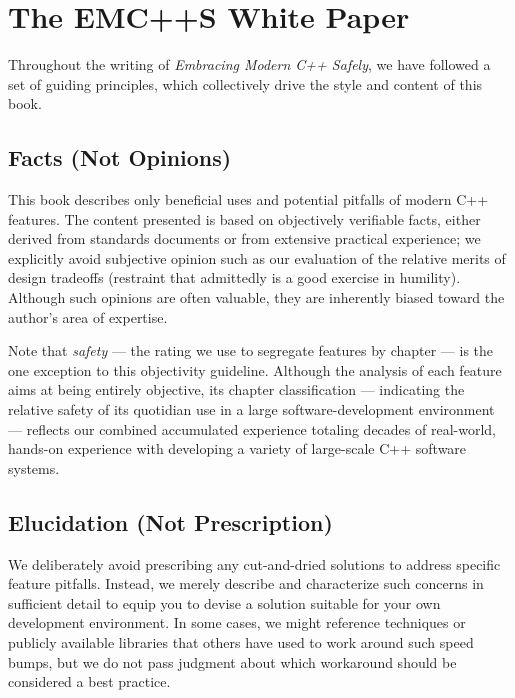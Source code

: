 \section[The {\itshape EMC++S} White Paper]{The {\sfbsectionitalRomeo EMC++S} White Paper}

Throughout the writing of \textit{Embracing Modern C++ Safely}, we have followed a set of guiding principles, which collectively drive the style and content of this book.

\subsection{Facts (Not Opinions)}

This book describes only beneficial uses and potential pitfalls of modern C++ features. The content presented is based on objectively verifiable facts, either derived from standards documents or from extensive practical experience; we explicitly avoid subjective opinion such as our evaluation of the relative merits of design tradeoffs (restraint that admittedly is a good exercise in humility). Although such opinions are often valuable, they are inherently biased toward the author's area of expertise.

Note that \textit{safety} --- the rating we use to segregate features by chapter --- is the one exception to this objectivity guideline. Although the analysis of each feature aims at being entirely objective, its chapter classification --- indicating the relative safety of its quotidian use in a large software-development environment --- reflects our combined accumulated experience totaling decades of real-world, hands-on experience with developing a variety of large-scale C++ software systems.

\subsection{Elucidation (Not Prescription)}

We deliberately avoid prescribing any cut-and-dried solutions to address specific feature pitfalls. Instead, we merely describe and characterize such concerns in sufficient detail to equip you to devise a solution suitable for your own development environment. In some cases, we might reference techniques or publicly available libraries that others have used to work around such speed bumps, but we do not pass judgment about which workaround should be considered a best practice.

